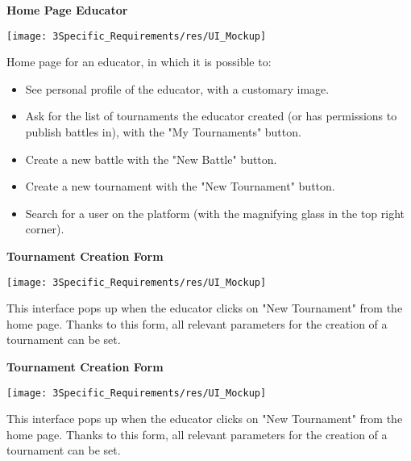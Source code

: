 \vspace{1cm}

\begin{minipage}{\linewidth}
	\textbf{Home Page Educator}
	\begin{center}
		\texttt{[image: 3Specific\_Requirements/res/UI\_Mockup]}
		
	\end{center}
	Home page for an educator, in which it is possible to:
	\begin{itemize}
		\item See personal profile of the educator, with a customary image.
		\item Ask for the list of tournaments the educator created (or has permissions to publish battles in), with the "My Tournaments" button.
		\item Create a new battle with the "New Battle" button. 
		\item Create a new tournament with the "New Tournament" button.
		\item Search for a user on the platform (with the magnifying glass in the top right corner). 
	\end{itemize}
\end{minipage}

\vspace{1cm}

\begin{minipage}{\linewidth}
	\textbf{Tournament Creation Form}
	\begin{center}
		\texttt{[image: 3Specific\_Requirements/res/UI\_Mockup]}
		
	\end{center}
 	This interface pops up when the educator clicks on "New Tournament" from the home page. Thanks to this form, all relevant parameters for the creation of a tournament can be set.

\end{minipage}

\vspace{1cm}

\begin{minipage}{\linewidth}
	\textbf{Tournament Creation Form}
	\begin{center}
		\texttt{[image: 3Specific\_Requirements/res/UI\_Mockup]}
		
	\end{center}
	This interface pops up when the educator clicks on "New Tournament" from the home page. Thanks to this form, all relevant parameters for the creation of a tournament can be set.
	
\end{minipage}